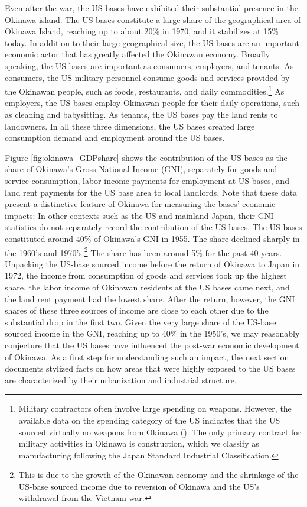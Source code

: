 \documentclass[12pt, unicode, a4paper]{article}
\newcommand{\1}{\mbox{1}\hspace{-0.25em}\mbox{l}} %
\begin{document}
Even after the war, the US bases have exhibited their substantial presence in the Okinawa island.
The US bases constitute a large share of the geographical area of Okinawa Island, reaching up to about 20\% in 1970, and it stabilizes at 15\% today.
In addition to their large geographical size, the US bases are an important economic actor that has greatly affected the Okinawan economy. 
Broadly speaking, the US bases are important as consumers, employers, and tenants. 
As consumers, the US military personnel consume goods and services provided by the Okinawan people, such as foods, restaurants, and daily commodities.\footnote{
Military contractors often involve large spending on weapons. However, the available data on the spending category of the US indicates that the US sourced virtually no weapons from Okinawa (\citealt{ReversionIssuesStudyGroup}). 
The only primary contract for military activities in Okinawa is construction, which we classify as manufacturing following the Japan Standard Industrial Classification.
}
As employers, the US bases employ Okinawan people for their daily operations, such as cleaning and babysitting. As tenants, the US bases pay the land rents to landowners.
In all these three dimensions, the US bases created large consumption demand and employment around the US bases.

Figure \ref{fig:okinawa_GDPshare} shows the contribution of the US bases as the share of Okinawa's Gross National Income (GNI), separately for goods and service consumption, labor income payments for employment at US bases, and land rent payments for the US base area to local landlords.
Note that these data present a distinctive feature of Okinawa for measuring the bases' economic impacts: In other contexts such as the US and mainland Japan, their GNI statistics do not separately record the contribution of the US bases.
The US bases constituted around 40\% of Okinawa's GNI in 1955. The share declined sharply in the 1960's and 1970's.\footnote{This is due to the growth of the Okinawan economy and the shrinkage of the US-base sourced income due to reversion of Okinawa and the US's withdrawal from the Vietnam war.}
The share has been around 5\% for the past 40 years. 
Unpacking the US-base sourced income before the return of Okinawa to Japan in 1972, the income from consumption of goods and services took up the highest share, the labor income of Okinawan residents at the US bases came next, and the land rent payment had the lowest share. After the return, however, the GNI shares of these three sources of income are close to each other due to the substantial drop in the first two. 
Given the very large share of the US-base sourced income in the GNI, reaching up to 40\% in the 1950's, we may reasonably conjecture that the US bases have influenced the post-war economic development of Okinawa. 
As a first step for understanding such an impact, the next section documents stylized facts on how areas that were highly exposed to the US bases are characterized by their urbanization and industrial structure. 
\end{document}
